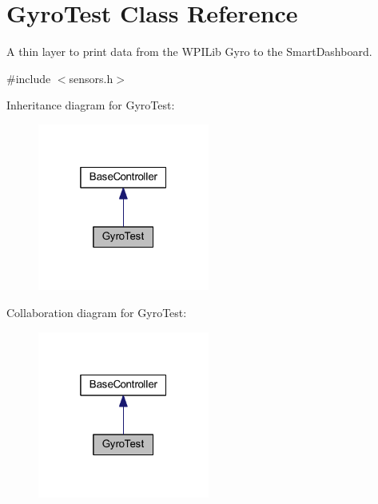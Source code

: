 \hypertarget{class_gyro_test}{\section{\-Gyro\-Test \-Class \-Reference}
\label{class_gyro_test}
}


\-A thin layer to print data from the \-W\-P\-I\-Lib \-Gyro to the \-Smart\-Dashboard.  




{\ttfamily \#include $<$sensors.\-h$>$}



\-Inheritance diagram for \-Gyro\-Test\-:\nopagebreak
\begin{figure}[H]
\begin{center}
\leavevmode
\includegraphics[width=160pt]{class_gyro_test__inherit__graph}
\end{center}
\end{figure}


\-Collaboration diagram for \-Gyro\-Test\-:\nopagebreak
\begin{figure}[H]
\begin{center}
\leavevmode
\includegraphics[width=160pt]{class_gyro_test__coll__graph}
\end{center}
\end{figure}
